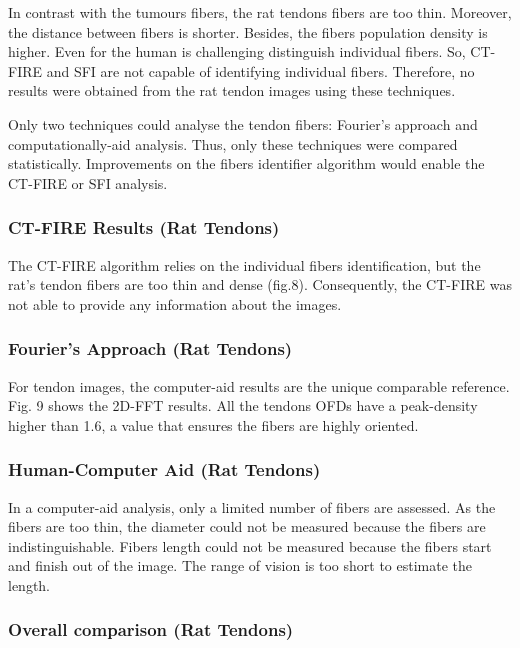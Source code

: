 \documentclass[12pt,a4paper]{article}
\begin{document}
In contrast with the tumours fibers, the rat tendons fibers are too thin. Moreover, the distance between fibers is shorter. Besides, the fibers population density is higher. Even for the human is challenging distinguish individual fibers. So, CT-FIRE and SFI are not capable of identifying individual fibers. Therefore, no results were obtained from the rat tendon images using these techniques.

Only two techniques could analyse the tendon fibers: Fourier's approach and computationally-aid analysis. Thus, only these techniques were compared statistically. Improvements on the fibers identifier algorithm would enable the CT-FIRE or SFI analysis. 

\subsubsection{CT-FIRE Results (Rat Tendons)}

The CT-FIRE algorithm relies on the individual fibers identification, but the rat’s tendon fibers are too thin and dense (fig.8). Consequently, the CT-FIRE was not able to provide any information about the images.

\subsubsection{Fourier’s Approach (Rat Tendons)}

For tendon images, the computer-aid results are the unique comparable reference. Fig. 9  shows the 2D-FFT results. All the tendons OFDs have a peak-density higher than 1.6, a value that ensures the fibers are highly oriented.

\subsubsection{Human-Computer Aid (Rat Tendons)}

In a computer-aid analysis, only a limited number of fibers are assessed. As the fibers are too thin, the diameter could not be measured because the fibers are indistinguishable. Fibers length could not be measured because the fibers start and finish out of the image. The range of vision is too short to estimate the length. 

\subsubsection{Overall comparison (Rat Tendons)}
\end{document}
